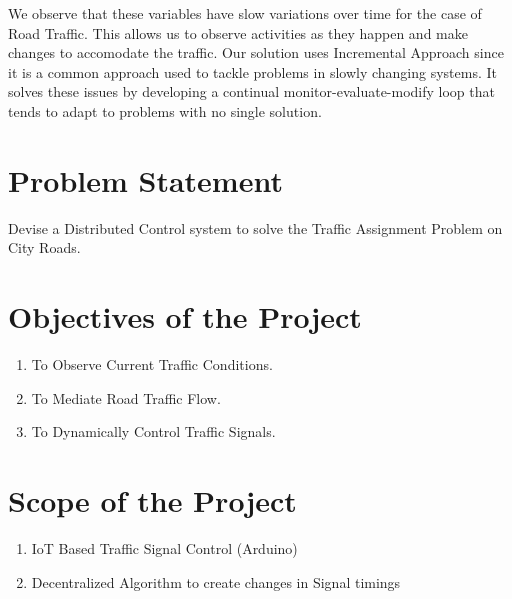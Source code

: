 \documentclass[12pt,a4paper,final]{report}
\begin{document}
We observe that these variables have slow variations over time for the case of Road Traffic. This allows us to observe activities as they happen and make changes to accomodate the traffic. Our solution uses Incremental Approach since it is a common approach used to tackle problems in slowly changing systems. It solves these issues by developing a continual monitor-evaluate-modify loop that tends to adapt to problems with no single solution. 

\section{Problem Statement}
Devise a Distributed Control system to solve the Traffic Assignment Problem on City Roads.

\section{Objectives of the Project}
\begin{enumerate}
\item
To Observe Current Traffic Conditions.

\item
To Mediate Road Traffic Flow.

\item
To Dynamically Control Traffic Signals.

\end{enumerate}

\section{Scope of the Project}
\begin{enumerate}
\item
IoT Based Traffic Signal Control (Arduino)
\item
Decentralized Algorithm to create changes in Signal timings
\end{enumerate}

\newpage

\end{document}
